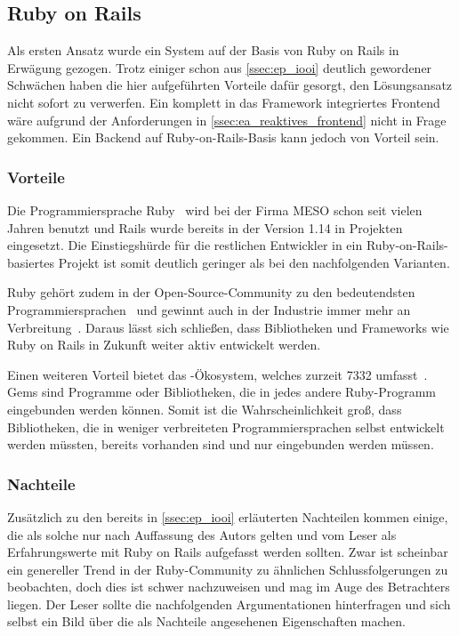 \subsection{Ruby on Rails}
\label{ssec:kl_ruby_on_rails}

Als ersten Ansatz wurde ein System auf der Basis von Ruby on Rails in Erwägung
gezogen.  Trotz einiger schon aus
\cref{ssec:ep_iooi} deutlich gewordener
Schwächen haben die hier aufgeführten Vorteile dafür gesorgt, den Lösungsansatz
nicht sofort zu verwerfen.  Ein komplett in das Framework integriertes Frontend
wäre aufgrund der Anforderungen in \cref{ssec:ea_reaktives_frontend} nicht in
Frage gekommen.  Ein Backend auf Ruby-on-Rails-Basis kann jedoch von Vorteil
sein.

\subsubsection{Vorteile}
\label{sssec:elr_vorteile}

Die Programmiersprache Ruby~\cite{ruby} wird bei der Firma MESO schon seit vielen
Jahren benutzt und Rails wurde bereits in der Version 1.14 in Projekten
eingesetzt.  Die Einstiegshürde für die restlichen Entwickler in ein
Ruby-on-Rails-basiertes Projekt ist somit deutlich geringer als bei den
nachfolgenden Varianten.

Ruby gehört zudem in der Open-Source-Community zu den bedeutendsten
Programmiersprachen~\cite{ghlangtrends} und gewinnt auch in der Industrie immer
mehr an Verbreitung~\cite{tiobe}.  Daraus lässt sich schließen, dass
Bibliotheken und Frameworks wie Ruby on Rails in Zukunft weiter aktiv entwickelt
werden.

Einen weiteren Vorteil bietet das -Ökosystem, welches
zurzeit 7332  umfasst~\cite{rubygems}.  Gems sind Programme
oder Bibliotheken, die in jedes andere Ruby-Programm eingebunden werden können.
Somit ist die Wahrscheinlichkeit groß, dass Bibliotheken, die in weniger
verbreiteten Programmiersprachen selbst entwickelt werden müssten, bereits
vorhanden sind und nur eingebunden werden müssen.

\subsubsection{Nachteile}
\label{sssec:elr_nachteile}

Zusätzlich zu den bereits in \cref{ssec:ep_iooi} erläuterten Nachteilen kommen
einige, die als solche nur nach Auffassung des Autors gelten und vom Leser als
Erfahrungswerte mit Ruby on Rails aufgefasst werden sollten.  Zwar ist
scheinbar ein genereller Trend in der Ruby-Community zu ähnlichen
Schlussfolgerungen zu beobachten, doch dies ist schwer nachzuweisen und mag im
Auge des Betrachters liegen.  Der Leser sollte die nachfolgenden
Argumentationen hinterfragen und sich selbst ein Bild über die als Nachteile
angesehenen Eigenschaften machen.

